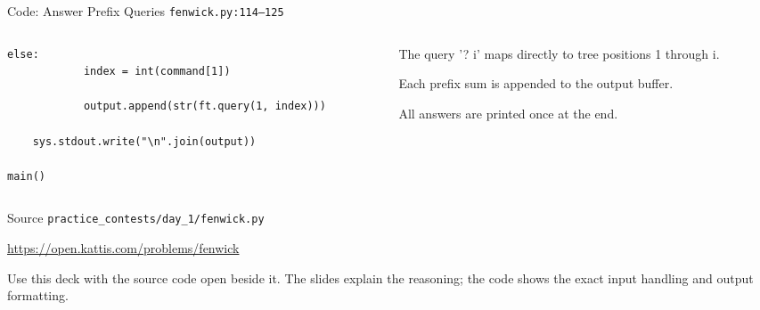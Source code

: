 \documentclass[aspectratio=169,11pt]{beamer}
\begin{document}
\begin{frame}[fragile]{Code: Answer Prefix Queries}
\scriptsize
{} \texttt{fenwick.py:114--125}

\vspace{0.08cm}
\begin{columns}[T,totalwidth=\textwidth]
\begin{column}{0.58\textwidth}
\begin{lstlisting}[style=cpcode]
        else:
            index = int(command[1])

            output.append(str(ft.query(1, index)))

    sys.stdout.write("\n".join(output))

main()
\end{lstlisting}
\end{column}
\begin{column}{0.38\textwidth}
\begin{tightitemize}
  \item The query '? i' maps directly to tree positions 1 through i.
  \item Each prefix sum is appended to the output buffer.
  \item All answers are printed once at the end.
\end{tightitemize}
\end{column}
\end{columns}
\end{frame}

\begin{frame}{Source}
\small
{} \texttt{practice\_contests/day\_1/fenwick.py}

\vspace{0.3cm}
 \url{https://open.kattis.com/problems/fenwick}

\vspace{0.45cm}
Use this deck with the source code open beside it. The slides explain the reasoning; the code shows the exact input handling and output formatting.
\end{frame}
\end{document}
